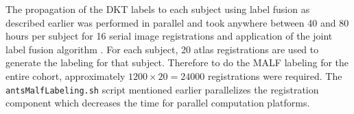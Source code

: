 The propagation of the DKT labels to each subject using label fusion as described earlier
was performed in parallel and took anywhere between 40 and 80 hours per 
subject for 16 serial image registrations and application of the joint label fusion algorithm \citep{wang2013}. For each subject, 20 atlas registrations are used to generate the labeling 
for that subject.  Therefore to do the MALF labeling for the entire cohort, approximately 
$1200 \times 20 = 24000$ registrations were required.  The {\tt antsMalfLabeling.sh} script
mentioned earlier parallelizes
the registration component which decreases the time for parallel computation platforms.
 
 
 

